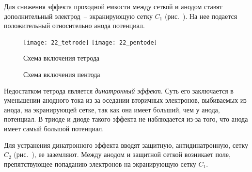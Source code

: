 Для снижения эффекта проходной емкости между сеткой и анодом ставят
дополнительный электрод~-- экранирующую сетку \( C_1 \) (рис.~).
На нее подается положительный относительно анода потенциал.
\vspace{-1em}
\begin{figure}[h!]
  \center
  \texttt{[image: 22\_tetrode]} \hspace{1em}
  \texttt{[image: 22\_pentode]} \\
  \parbox{.3\textwidth}{\caption{Схема включения тетрода} \label{pic22tetrode}}
    \hspace{1em}
  \parbox{.3\textwidth}{\caption{Схема включения пентода} \label{pic22pentode}}
\end{figure}
\vspace{-1.5em}

Недостатком тетрода является \emph{динатронный эффект}. Суть его заключается в
уменьшении анодного тока из-за оседании вторичных электронов, выбиваемых из
анода, на экранирующей сетке, так как она имеет больший, чем у анода, потенциал.
В триоде и диоде такого эффекта не наблюдается из-за того, что анода имеет самый
большой потенциал.


Для устранения динатронного эффекта вводят защитную, антидинатронную, сетку
\( C_2 \) (рис.~), ее заземляют. Между анодом и защитной сеткой
возникает поле, препятствующее попаданию электронов на экранирующую сетку
\( C_1 \).
